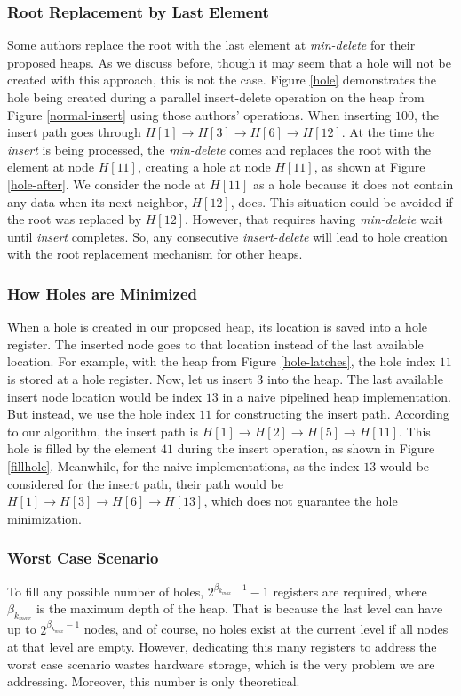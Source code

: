 \subsubsection{Root Replacement by Last Element}
Some authors replace the root with the last element at {\it min-delete} \cite{hw2,hw3} for their proposed heaps. 
As we discuss before, though it may seem that a hole will not be created with this approach, this is not the case. 
Figure \ref{hole} demonstrates the hole being created during a parallel insert-delete operation on the heap from Figure \ref{normal-insert} using those authors' operations.
When inserting $100$, the insert path goes through $H[1] \rightarrow H[3] \rightarrow  H[6] \rightarrow  H[12]$. 
At the time the {\it insert} is being processed, the {\it min-delete} comes and replaces the root with the element at node $H[11]$, creating a hole at node $H[11]$, as shown at Figure \ref{hole-after}. 
We consider the node at $H[11]$ as a hole because it does not contain any data when its next neighbor, $H[12]$, does. 
This situation could be avoided if the root was replaced by $H[12]$.
However, that requires having {\it min-delete} wait until {\it insert} completes. 
So, any consecutive {\it insert-delete} will lead to hole creation with the root replacement mechanism for other heaps.

\subsubsection{How Holes are Minimized} 
When a hole is created in our proposed heap, its location is saved into a hole register. 
The inserted node goes to that location instead of the last available location. 
For example, with the heap from Figure \ref{hole-latches}, the hole index $11$ is stored at a hole register. 
Now, let us insert $3$ into the heap. 
The last available insert node location would be index $13$ in a naive pipelined heap implementation. 
But instead, we use the hole index $11$ for constructing the insert path. 
According to our algorithm, the insert path is $H[1] \rightarrow H[2] \rightarrow H[5] \rightarrow H[11]$. 
This hole is filled by the element $41$ during the insert operation, as shown in Figure \ref{fillhole}. 
Meanwhile, for the naive implementations, as the index $13$ would be considered for the insert path, their path would be $H[1] \rightarrow H[3] \rightarrow H[6] \rightarrow H[13]$, which does not guarantee the hole minimization.


\subsubsection{Worst Case Scenario}
To fill any possible number of holes, $2^{\beta_{k_{max}}-1} - 1$ registers are required, where $\beta_{k_{max}}$ is the maximum depth of the heap. 
That is because the last level can have up to $2^{\beta_{k_{max}}-1}$ nodes, and of course, no holes exist at the current level if all nodes at that level are empty.
However, dedicating this many registers to address the worst case scenario wastes hardware storage, which is the very problem we are addressing. 
Moreover, this number is only theoretical.

